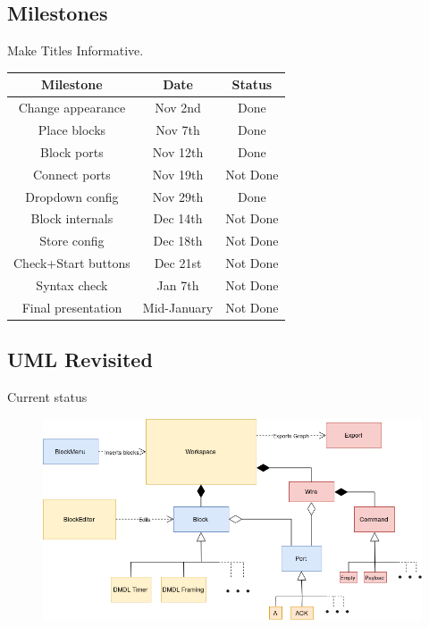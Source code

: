 \documentclass{beamer}
\begin{document}
\subsection{Milestones}
\begin{frame}{Make Titles Informative.}
\centering
	\begin{tabular}{|c|c|c|} \hline
		\textbf{Milestone} & \textbf{Date} & \textbf{Status} \\ \hline
		Change appearance & Nov 2nd & Done \\ \hline
		Place blocks & Nov 7th & Done \\ \hline
		Block ports & Nov 12th & Done \\ \hline
		Connect ports & Nov 19th & Not Done \\ \hline
		Dropdown config & Nov 29th & Done \\ \hline
		Block internals & Dec 14th & Not Done \\ \hline
		Store config & Dec 18th & Not Done \\ \hline
		Check+Start buttons & Dec 21st & Not Done \\ \hline
		Syntax check & Jan 7th & Not Done \\ \hline
		Final presentation & Mid-January & Not Done \\ \hline
	\end{tabular}
\end{frame}


\subsection{UML Revisited}
\begin{frame}{Current status}
\centering
	\begin{figure}
 		\includegraphics[width=\linewidth]{dmdl-editor-status.png}
 		\label{fig:uml-status}
	\end{figure}
\end{frame}
\end{document}
